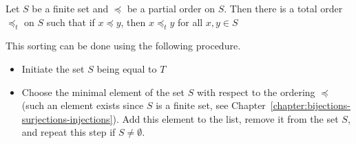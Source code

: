 \begin{theorem}
\label{theorem:topological-order}
  Let $S$ be a finite set and $\preceq$ be a partial order on $S$. Then there is
  a total order $\preceq_t$ on $S$ such that if $x \preceq y$, then
  $x \preceq_t y$ for all $x, y \in S$
\end{theorem}

This sorting can be done using the following procedure.
\begin{itemize}
  \item Initiate the set $S$ being equal to $T$
  \item Choose the minimal element of the set $S$ with respect to the ordering
    $\preceq$ (such an element exists since $S$ is a finite set, see
    Chapter~\ref{chapter:bijections-surjections-injections}).
    Add this element to the list, remove it from the set $S$, and repeat this
    step if $S \neq \emptyset$.
\end{itemize}

